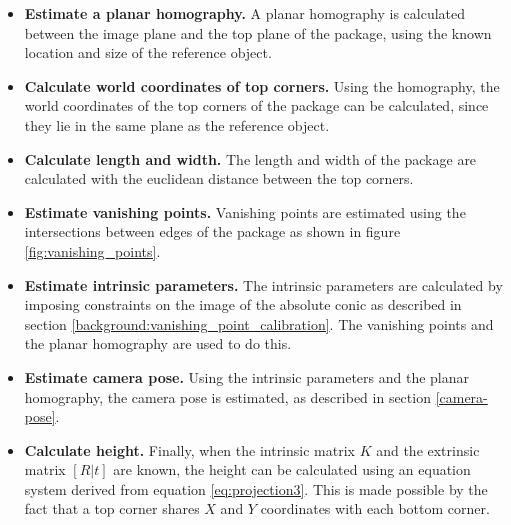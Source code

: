 \begin{itemize}
	\item \textbf{Estimate a planar homography.} A planar homography is calculated between the image plane and the top plane of the package, using the known location and size of the reference object.
	\item \textbf{Calculate world coordinates of top corners.} Using the homography, the world coordinates of the top corners of the package can be calculated, since they lie in the same plane as the reference object.
	\item \textbf{Calculate length and width.} The length and width of the package are calculated with the euclidean distance between the top corners.
	\item \textbf{Estimate vanishing points.} Vanishing points are estimated using the intersections between edges of the package as shown in figure \ref{fig:vanishing_points}.
	\item \textbf{Estimate intrinsic parameters.} The intrinsic parameters are calculated by imposing constraints on the image of the absolute conic as described in section \ref{background:vanishing_point_calibration}. The vanishing points and the planar homography are used to do this.
	\item \textbf{Estimate camera pose.} Using the intrinsic parameters and the planar homography, the camera pose is estimated, as described in section \ref{camera-pose}.
	\item \textbf{Calculate height.} Finally, when the intrinsic matrix $K$ and the extrinsic matrix $[R|t]$ are known, the height can be calculated using an equation system derived from equation \ref{eq:projection3}. This is made possible by the fact that a top corner shares $X$ and $Y$ coordinates with each bottom corner. 
\end{itemize}

